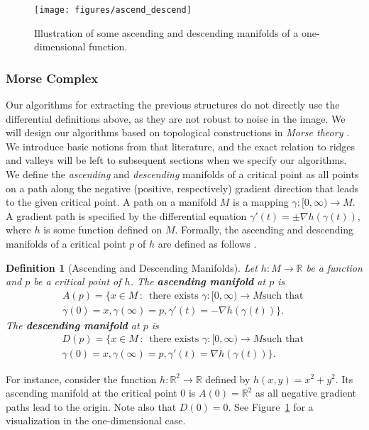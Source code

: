 \documentclass[10pt,journal,compsoc]{IEEEtran}
\newcommand{\R}{\mathbb{R}}
\newcommand{\comment}[1]{ }
\newtheorem{defn}{Definition}
\begin{document}
\begin{figure}
  \centering
  \texttt{[image: figures/ascend\_descend]}
  \caption{Illustration of some ascending and descending manifolds of a
    one-dimensional function.}
  \label{fig:morse_manifolds}
\end{figure}

\comment{
As that
literature can be fairly technical, we convey the main ideas without
excessive technicalities.
}

\subsubsection{Morse Complex}
Our algorithms for extracting the previous structures do not directly
use the differential definitions above, as they are not robust to
noise in the image. We will design our algorithms based on topological
constructions in \emph{Morse theory} \cite{milnor2016morse}. We
introduce basic notions from that literature, and the exact relation
to ridges and valleys will be left to subsequent sections when we
specify our algorithms. We define the \emph{ascending} and
\emph{descending} manifolds of a critical point as all points on a
path along the negative (positive, respectively) gradient direction
that leads to the given critical point. A path on a manifold $M$ is a
mapping $\gamma : [0,\infty) \to M$.  A gradient path is specified by
the differential equation $\gamma'(t) = \pm \nabla h(\gamma(t))$,
where $h$ is some function defined on $M$. Formally, the ascending and
descending manifolds of a critical point $p$ of $h$ are defined as
follows \cite{zomorodian2009topology}.
\begin{defn}[Ascending and Descending Manifolds]
  Let $h : M\to \R$ be a function and $p$ be a critical point of
  $h$. The {\bf ascending manifold} at $p$ is
  \begin{multline}
    A(p) = \{ x\in M \,:\, \mbox{ there exists $\gamma : [0,\infty)\to M$
      such that } \\ 
    \gamma(0) = x, \gamma(\infty) = p, \gamma'(t) = -\nabla
    h(\gamma(t)) \}.
  \end{multline}
  The {\bf descending manifold} at $p$ is
  \begin{multline}
    D(p) = \{ x\in M \,:\, \mbox{ there exists $\gamma : [0,\infty)\to M$
      such that } \\ 
    \gamma(0) = x, \gamma(\infty) = p, \gamma'(t) = \nabla
    h(\gamma(t)) \}.
  \end{multline}
\end{defn}
For instance, consider the function $h : \R^2 \to \R$ defined by
$h(x,y) = x^2+y^2$. Its ascending manifold at the critical point $0$
is $A(0) = \R^2$ as all negative gradient paths lead to the origin. Note also
that $D(0) = 0$. See Figure~\ref{fig:morse_manifolds} for a
visualization in the one-dimensional case.
\end{document}
